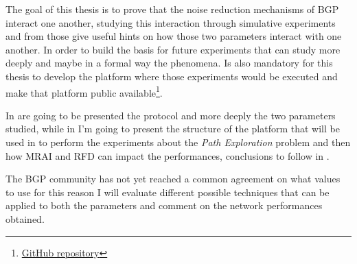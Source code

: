 
The goal of this thesis is to prove that the noise reduction mechanisms of \ac{BGP}
interact one another, studying this interaction through simulative experiments
and from those give useful hints on how those two parameters interact with one another.
In order to build the basis for future experiments that can study more deeply
and maybe in a formal way the phenomena.
Is also mandatory for this thesis to develop the platform where those experiments
would be executed and make that platform public
available\footnote{\href{https://github.com/tiamilani/BGPFSM}{GitHub repository}}.

In  are going to be presented the protocol and more deeply
the two parameters studied, while in  I'm going to present
the structure of the platform that will be used in
to perform the experiments about the \textit{Path Exploration} problem and then
how \ac{MRAI} and \ac{RFD} can impact the performances, conclusions to follow
in .

The \ac{BGP} community has not yet reached a common agreement on what values
to use for this reason I will evaluate different possible techniques that can
be applied to both the parameters and comment on the network performances obtained.

